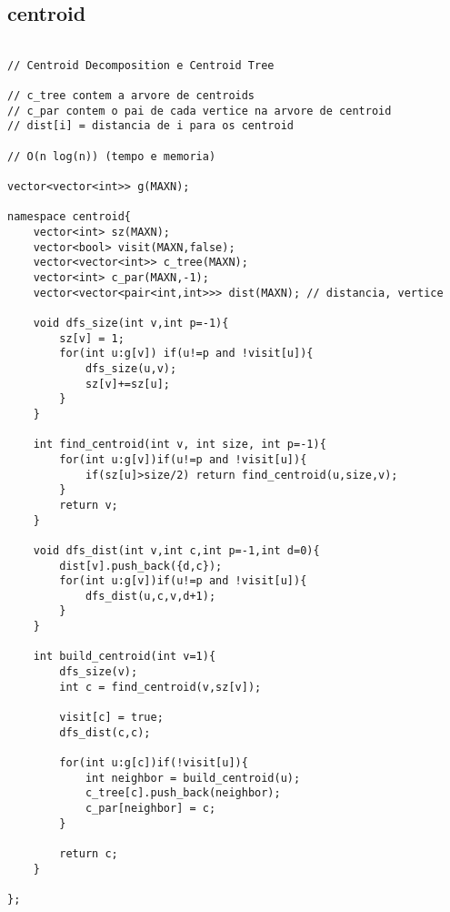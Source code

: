 \documentclass[landscape,twocolumn,10pt,a4paper]{article}
\begin{document}
\subsection{centroid}
\begin{verbatim}

// Centroid Decomposition e Centroid Tree

// c_tree contem a arvore de centroids
// c_par contem o pai de cada vertice na arvore de centroid
// dist[i] = distancia de i para os centroid

// O(n log(n)) (tempo e memoria)

vector<vector<int>> g(MAXN);

namespace centroid{
    vector<int> sz(MAXN);
    vector<bool> visit(MAXN,false);
    vector<vector<int>> c_tree(MAXN);
    vector<int> c_par(MAXN,-1);
    vector<vector<pair<int,int>>> dist(MAXN); // distancia, vertice

    void dfs_size(int v,int p=-1){
        sz[v] = 1;
        for(int u:g[v]) if(u!=p and !visit[u]){
            dfs_size(u,v);
            sz[v]+=sz[u];
        }
    }

    int find_centroid(int v, int size, int p=-1){
        for(int u:g[v])if(u!=p and !visit[u]){
            if(sz[u]>size/2) return find_centroid(u,size,v);
        }
        return v;
    }

    void dfs_dist(int v,int c,int p=-1,int d=0){
        dist[v].push_back({d,c});
        for(int u:g[v])if(u!=p and !visit[u]){
            dfs_dist(u,c,v,d+1);
        }
    }

    int build_centroid(int v=1){
        dfs_size(v);
        int c = find_centroid(v,sz[v]);

        visit[c] = true;
        dfs_dist(c,c);

        for(int u:g[c])if(!visit[u]){
            int neighbor = build_centroid(u);
            c_tree[c].push_back(neighbor);
            c_par[neighbor] = c;
        }

        return c;
    }

};

\end{verbatim}
\end{document}
